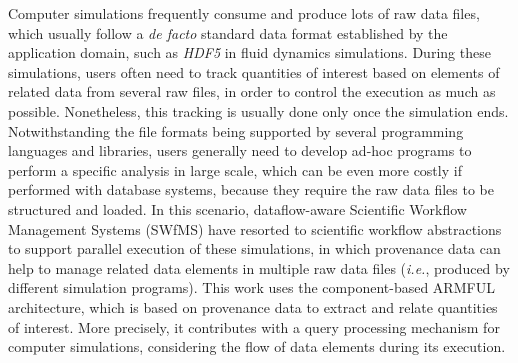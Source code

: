 \begin{foreignabstract}

Computer simulations frequently consume and produce lots of raw data files, which usually follow a \textit{de facto} standard data format established by the application domain, such as \textit{HDF5} in fluid dynamics simulations.
During these simulations, users often need to track quantities of interest based on elements of related data from several raw files, in order to control the execution as much as possible. Nonetheless, this tracking is usually done only once the simulation ends.
Notwithstanding the file formats being supported by several programming languages and libraries, users generally need to develop ad-hoc programs to perform a specific analysis in large scale, which can be even more costly if performed with database systems, because they require the raw data files to be structured and loaded. In this scenario, dataflow-aware Scientific Workflow Management Systems (SWfMS) have resorted to scientific workflow abstractions to support parallel execution of these simulations, in which provenance data can help to manage related data elements in multiple raw data files (\textit{i.e.}, produced by different simulation programs).
This work uses the component-based ARMFUL architecture, which is based on provenance data to extract and relate quantities of interest. More precisely, it contributes with a query processing mechanism for computer simulations, considering the flow of data elements during its execution.

\end{foreignabstract}
